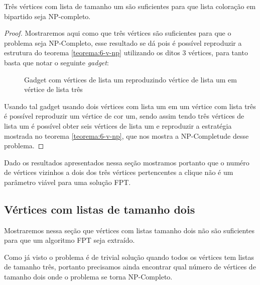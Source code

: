 \begin{teorema}
  Três vértices com lista de tamanho um são suficientes para que lista coloração em bipartido seja NP-completo.
\end{teorema}
\begin{proof}
  Mostraremos aqui como que três vértices são suficientes para que o problema seja NP-Completo, esse resultado se dá pois é possível reproduzir a estrutura do teorema \ref{teorema:6-v-np} utilizando os ditos 3 vértices, para tanto basta que notar o seguinte \emph{gadget}:
  
\begin{figure}[H]
  \begin{subfigure}
    \centering
		
  \end{subfigure}
  \begin{subfigure}
    \centering
		
  \end{subfigure}
  \begin{subfigure}
    \centering
		
  \end{subfigure}
  \caption{Gadget com vértices de lista um reproduzindo vértice de lista um em vértice de lista três}
\end{figure}

Usando tal gadget usando dois vértices com lista um em um vértice com lista três é possível reproduzir um vértice de cor um, sendo assim tendo três vértices de lista um é possível obter seis vértices de lista um e reproduzir a estratégia mostrada no teorema \ref{teorema:6-v-np}, que nos mostra a NP-Completude desse problema.
  
\end{proof}
 Dado os resultados apresentados nessa seção mostramos portanto que o numéro de vértices vizinhos a dois dos três vértices pertencentes a clique não é um parâmetro viável para uma solução FPT.
  
\subsection{Vértices com listas de tamanho dois}
Mostraremos nessa seção que vértices com listas tamanho dois não são suficientes para que um algoritmo FPT seja extraído.

Como já visto o problema é de trivial solução quando todos os vértices tem listas de tamanho três, portanto precisamos ainda encontrar qual número de vértices de tamanho dois onde o problema se torna NP-Completo.

